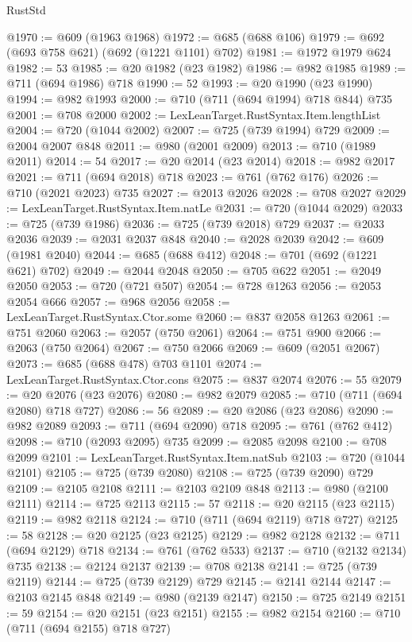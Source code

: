 \begin{lexlean}{RustStd}
\begin{coremodule}
@1970 := @609 (@1963 @1968)
@1972 := @685 (@688 @106)
@1979 := @692 (@693 @758 @621) (@692 (@1221 @1101) @702)
@1981 := @1972 @1979 @624
@1982 := 53
@1985 := @20 @1982 (@23 @1982)
@1986 := @982 @1985
@1989 := @711 (@694 @1986) @718
@1990 := 52
@1993 := @20 @1990 (@23 @1990)
@1994 := @982 @1993
@2000 := @710 (@711 (@694 @1994) @718 @844) @735
@2001 := @708 @2000
@2002 := LexLeanTarget.RustSyntax.Item.lengthList
@2004 := @720 (@1044 @2002)
@2007 := @725 (@739 @1994) @729
@2009 := @2004 @2007 @848
@2011 := @980 (@2001 @2009)
@2013 := @710 (@1989 @2011)
@2014 := 54
@2017 := @20 @2014 (@23 @2014)
@2018 := @982 @2017
@2021 := @711 (@694 @2018) @718
@2023 := @761 (@762 @176)
@2026 := @710 (@2021 @2023) @735
@2027 := @2013 @2026
@2028 := @708 @2027
@2029 := LexLeanTarget.RustSyntax.Item.natLe
@2031 := @720 (@1044 @2029)
@2033 := @725 (@739 @1986)
@2036 := @725 (@739 @2018) @729
@2037 := @2033 @2036
@2039 := @2031 @2037 @848
@2040 := @2028 @2039
@2042 := @609 (@1981 @2040)
@2044 := @685 (@688 @412)
@2048 := @701 (@692 (@1221 @621) @702)
@2049 := @2044 @2048
@2050 := @705 @622
@2051 := @2049 @2050
@2053 := @720 (@721 @507)
@2054 := @728 @1263
@2056 := @2053 @2054 @666
@2057 := @968 @2056
@2058 := LexLeanTarget.RustSyntax.Ctor.some
@2060 := @837 @2058 @1263
@2061 := @751 @2060
@2063 := @2057 (@750 @2061)
@2064 := @751 @900
@2066 := @2063 (@750 @2064)
@2067 := @750 @2066
@2069 := @609 (@2051 @2067)
@2073 := @685 (@688 @478) @703 @1101
@2074 := LexLeanTarget.RustSyntax.Ctor.cons
@2075 := @837 @2074
@2076 := 55
@2079 := @20 @2076 (@23 @2076)
@2080 := @982 @2079
@2085 := @710 (@711 (@694 @2080) @718 @727)
@2086 := 56
@2089 := @20 @2086 (@23 @2086)
@2090 := @982 @2089
@2093 := @711 (@694 @2090) @718
@2095 := @761 (@762 @412)
@2098 := @710 (@2093 @2095) @735
@2099 := @2085 @2098
@2100 := @708 @2099
@2101 := LexLeanTarget.RustSyntax.Item.natSub
@2103 := @720 (@1044 @2101)
@2105 := @725 (@739 @2080)
@2108 := @725 (@739 @2090) @729
@2109 := @2105 @2108
@2111 := @2103 @2109 @848
@2113 := @980 (@2100 @2111)
@2114 := @725 @2113
@2115 := 57
@2118 := @20 @2115 (@23 @2115)
@2119 := @982 @2118
@2124 := @710 (@711 (@694 @2119) @718 @727)
@2125 := 58
@2128 := @20 @2125 (@23 @2125)
@2129 := @982 @2128
@2132 := @711 (@694 @2129) @718
@2134 := @761 (@762 @533)
@2137 := @710 (@2132 @2134) @735
@2138 := @2124 @2137
@2139 := @708 @2138
@2141 := @725 (@739 @2119)
@2144 := @725 (@739 @2129) @729
@2145 := @2141 @2144
@2147 := @2103 @2145 @848
@2149 := @980 (@2139 @2147)
@2150 := @725 @2149
@2151 := 59
@2154 := @20 @2151 (@23 @2151)
@2155 := @982 @2154
@2160 := @710 (@711 (@694 @2155) @718 @727)

\end{coremodule}
\end{lexlean}
